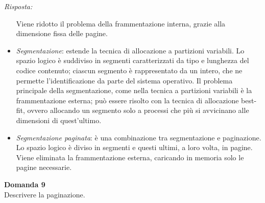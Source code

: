 \documentclass{article}
\newenvironment{problem}[2][Domanda]
    { \begin{mdframed}[backgroundcolor=gray!20] \textbf{#1 #2} \\}
    {  \end{mdframed}}
\newenvironment{solution}
    {\textit{Risposta:}}
    {}
\begin{document}
\begin{solution}
\begin{itemize}
    \newline
    Viene ridotto il problema della frammentazione interna, grazie alla dimensione fissa delle pagine.
    \item \emph{Segmentazione}: estende la tecnica di allocazione a partizioni variabili.
    \newline
    Lo spazio logico è suddiviso in segmenti caratterizzati da tipo e lunghezza del codice contenuto; ciascun segmento è rappresentato da un intero, che ne permette l'identificazione da parte del sistema operativo.
    \newline
    Il problema principale della segmentazione, come nella tecnica a partizioni variabili è la frammentazione esterna; può essere risolto con la tecnica di allocazione best-fit, ovvero allocando un segmento solo a processi che più si avvicinano alle dimensioni di quest'ultimo.
    \item \emph{Segmentazione paginata}: è una combinazione tra segmentazione e paginazione. Lo spazio logico è diviso in segmenti e questi ultimi, a loro volta, in pagine.
    \newline Viene eliminata la frammentazione esterna, caricando in memoria solo le pagine necessarie.
\end{itemize}
\end{solution}
\begin{problem}{9}
Descrivere la paginazione.
\end{problem}
\end{document}
